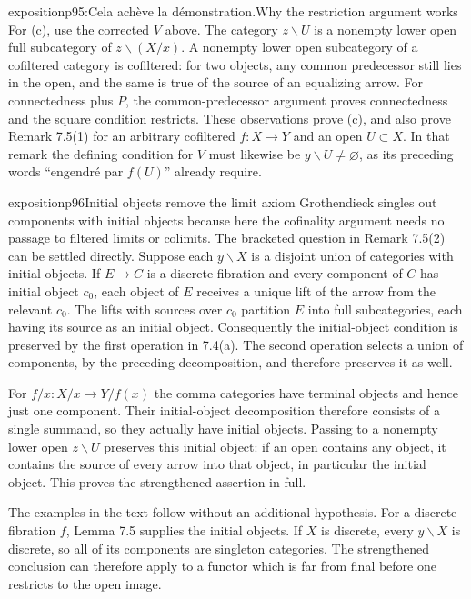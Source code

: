 \begin{dcomment}{exposition}{p95:Cela achève la démonstration.}{Why the restriction argument works}
For (c), use the corrected $V$ above. The category $z\backslash U$ is a nonempty lower open full subcategory of $z\backslash(X/x)$. A nonempty lower open subcategory of a cofiltered category is cofiltered: for two objects, any common predecessor still lies in the open, and the same is true of the source of an equalizing arrow. For connectedness plus $P$, the common-predecessor argument proves connectedness and the square condition restricts. These observations prove (c), and also prove Remark 7.5(1) for an arbitrary cofiltered $f:X\to Y$ and an open $U\subset X$. In that remark the defining condition for $V$ must likewise be $y\backslash U\ne\varnothing$, as its preceding words ``engendr\'e par $f(U)$'' already require.
\end{dcomment}

\begin{dcomment}{exposition}{p96}{Initial objects remove the limit axiom}
Grothendieck singles out components with initial objects because here the cofinality argument needs no passage to filtered limits or colimits. The bracketed question in Remark 7.5(2) can be settled directly. Suppose each $y\backslash X$ is a disjoint union of categories with initial objects. If $E\to C$ is a discrete fibration and every component of $C$ has initial object $c_0$, each object of $E$ receives a unique lift of the arrow from the relevant $c_0$. The lifts with sources over $c_0$ partition $E$ into full subcategories, each having its source as an initial object. Consequently the initial-object condition is preserved by the first operation in 7.4(a). The second operation selects a union of components, by the preceding decomposition, and therefore preserves it as well.

For $f/x:X/x\to Y/f(x)$ the comma categories have terminal objects and hence just one component. Their initial-object decomposition therefore consists of a single summand, so they actually have initial objects. Passing to a nonempty lower open $z\backslash U$ preserves this initial object: if an open contains any object, it contains the source of every arrow into that object, in particular the initial object. This proves the strengthened assertion in full.

The examples in the text follow without an additional hypothesis. For a discrete fibration $f$, Lemma 7.5 supplies the initial objects. If $X$ is discrete, every $y\backslash X$ is discrete, so all of its components are singleton categories. The strengthened conclusion can therefore apply to a functor which is far from final before one restricts to the open image.


\end{dcomment}
